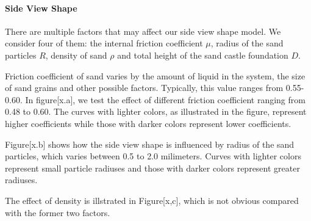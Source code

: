 \documentclass[12pt]{article}
\begin{document}
\paragraph{Side View Shape}
\par
There are multiple factors that may affect our side view shape model. We consider four of them: the internal friction coefficient $\mu$, radius of the sand particles $R$, density of sand $\rho$ and total height of the sand castle foundation $D$.
\par
Friction coefficient of sand varies by the amount of liquid in the system, the size of sand grains and other possible factors. Typically, this value ranges from 0.55-0.60. In figure[x.a], we test the effect of different friction coefficient ranging from 0.48 to 0.60. The curves with lighter colors, as illustrated in the figure, represent higher coefficients while those with darker colors represent lower coefficients.
\par
Figure[x.b] shows how the side view shape is influenced by radius of the sand particles, which varies between 0.5 to 2.0 milimeters. Curves with lighter colors represent small particle radiuses and those with darker colors represent greater radiuses.
\par
The effect of density is illstrated in Figure[x,c], which is not obvious compared with the former two factors.
\end{document}
